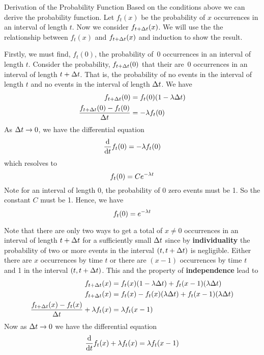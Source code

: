 \begin{theory}{Derivation of the Probability Function}
Based on the conditions above we can derive the probability function. Let $f_t(x)$ be the probability of $x$ occurrences in an interval of length $t$. Now we consider $f_{t + \Delta t}(x)$. We will use the the relationship between $f_t(x)$ and $f_{t + \Delta t}(x)$ and induction to show the result.
\par\smallskip
Firstly, we must find, $f_t(0)$, the probability of~0 occurrences in an interval of length $t$. Consider the probability, $f_{t + \Delta t}(0)$ that their are~0 occurrences in an interval of length $t + \Delta t$. That is, the probability of no events in the interval of length $t$ and no events in the interval of length $\Delta t$. We have
\begin{align*}
    f_{t+\Delta t}(0) &= f_t(0)(1 - \lambda \Delta t) \\
    \frac{f_{t+\Delta t}(0) - f_t(0)}{\Delta t} &= -\lambda f_t(0) \\
\end{align*}
As $\Delta t \rightarrow 0$, we have the differential equation
\[
    \frac{\operatorname{d}\!{}}{\operatorname{d}\!{t}} f_t(0) = -\lambda f_t(0)
\]
which resolves to
\[
    f_t(0) = Ce^{-\lambda t}
\]
Note for an interval of length 0, the probability of 0 zero events must be 1. So the constant $C$ must be 1. Hence, we have
\[
    f_t(0) = e^{-\lambda t}
\]
\par\smallskip
Note that there are only two ways to get a total of $x \neq 0$ occurrences in an interval of length $t + \Delta t$ for a sufficiently small $\Delta t$ since by \textbf{individuality} the probability of two or more events in the interval $(t, t + \Delta t)$ is negligible. Either there are $x$ occurrences by time $t$ or there are $(x-1)$ occurrences by time $t$ and 1 in the interval $(t, t + \Delta t)$. This and the property of \textbf{independence} lead to
\begin{align*}
    f_{t + \Delta t}(x) &= f_t(x)(1 - \lambda \Delta t) + f_t(x - 1)(\lambda \Delta t) \\
    f_{t + \Delta t}(x) &= f_t(x) - f_t(x)(\lambda \Delta t) + f_t(x - 1)(\lambda \Delta t) \\
    \frac{f_{t + \Delta t}(x) - f_t(x)}{\Delta t} + \lambda f_t(x) &= \lambda f_t(x-1)
\end{align*}
Now as $\Delta t \rightarrow 0$ we have the differential equation
\begin{align}
    \deriv{t} f_t(x) + \rate f_t(x) &= \rate f_t(x-1) \nonumber \\

\end{align}
\end{theory}
